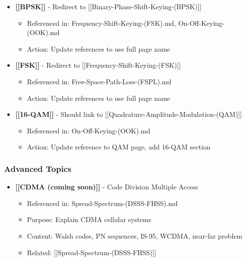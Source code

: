 \begin{itemize}
\tightlist
\item
  \textbf{{[}{[}BPSK{]}{]}} - Redirect to
  {[}{[}Binary-Phase-Shift-Keying-(BPSK){]}{]}

  \begin{itemize}
  \tightlist
  \item
    Referenced in: Frequency-Shift-Keying-(FSK).md,
    On-Off-Keying-(OOK).md
  \item
    Action: Update references to use full page name
  \end{itemize}
\item
  \textbf{{[}{[}FSK{]}{]}} - Redirect to
  {[}{[}Frequency-Shift-Keying-(FSK){]}{]}

  \begin{itemize}
  \tightlist
  \item
    Referenced in: Free-Space-Path-Loss-(FSPL).md
  \item
    Action: Update references to use full page name
  \end{itemize}
\item
  \textbf{{[}{[}16-QAM{]}{]}} - Should link to
  {[}{[}Quadrature-Amplitude-Modulation-(QAM){]}{]}

  \begin{itemize}
  \tightlist
  \item
    Referenced in: On-Off-Keying-(OOK).md
  \item
    Action: Update reference to QAM page, add 16-QAM section
  \end{itemize}
\end{itemize}

\subsubsection{Advanced Topics}\label{advanced-topics}

\begin{itemize}
\tightlist
\item
  \textbf{{[}{[}CDMA (coming soon){]}{]}} - Code Division Multiple
  Access

  \begin{itemize}
  \tightlist
  \item
    Referenced in: Spread-Spectrum-(DSSS-FHSS).md
  \item
    Purpose: Explain CDMA cellular systems
  \item
    Content: Walsh codes, PN sequences, IS-95, WCDMA, near-far problem
  \item
    Related: {[}{[}Spread-Spectrum-(DSSS-FHSS){]}{]}
  \end{itemize}
\end{itemize}


